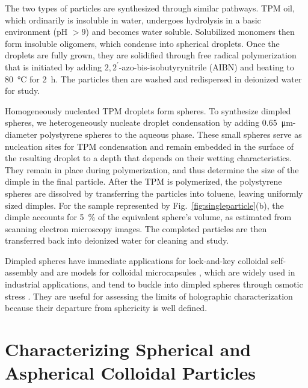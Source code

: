 The two types of particles are synthesized through similar pathways.
TPM oil, which ordinarily is insoluble in water,
undergoes hydrolysis in a basic environment (pH $> 9$) and becomes
water soluble.
Solubilized monomers then form insoluble oligomers,
which condense into spherical droplets.
Once the droplets are fully grown, they are solidified through
free radical polymerization that is initiated by adding 
$2,2^\prime$-azo-bis-isobutyrynitrile (AIBN) and 
heating to \SI{80}{\degreeCelsius} for 
\SI{2}{\hour}.
The particles then are washed and redispersed in deionized water
for study.

Homogeneously nucleated TPM droplets form spheres.
To synthesize dimpled spheres, we heterogeneously nucleate
droplet condensation by adding \SI{0.65}{\um}-diameter
polystyrene spheres to the aqueous phase.
These small spheres serve as nucleation sites for TPM condensation and remain
embedded in the surface of the resulting droplet to a depth that
depends on their wetting characteristics.
They remain in place during polymerization, and thus
determine the size of the dimple in the final particle. 
After the TPM is polymerized, the polystyrene spheres are
dissolved by transferring the particles into toluene, leaving
uniformly sized dimples.
For the sample represented by Fig.~\ref{fig:singleparticle}(b), the
dimple accounts for \SI{5}{\percent} of the equivalent sphere's
volume, as estimated from scanning electron microscopy images.
The completed particles are then transferred back into 
deionized water for cleaning and study.

Dimpled spheres have immediate applications for lock-and-key
colloidal self-assembly
\cite{sacanna10,macfarlane10,sacanna11,ashton13,phillips14,wang14} 
and are models for colloidal microcapsules \cite{chang64}, which are widely
used in industrial applications, and tend to buckle into dimpled spheres
through osmotic stress \cite{chang64,knoche11,jose14}. 
They are useful for assessing the limits of holographic
characterization because their departure from sphericity is well defined.

\section{Characterizing Spherical and Aspherical Colloidal Particles}

